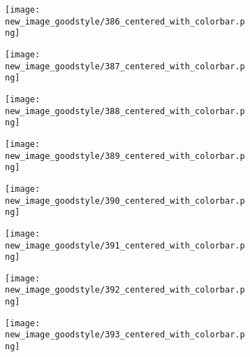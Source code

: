 \documentclass[a4paper,12pt]{article}
\begin{document}
\begin{figure}[H]
  \begin{subfigure}{0.11\textwidth}
    \texttt{[image: new\_image\_goodstyle/386\_centered\_with\_colorbar.png]}
  \end{subfigure}
  \hfill
  \begin{subfigure}{0.11\textwidth}
    \texttt{[image: new\_image\_goodstyle/387\_centered\_with\_colorbar.png]}
  \end{subfigure}
  \hfill
  \begin{subfigure}{0.11\textwidth}
    \texttt{[image: new\_image\_goodstyle/388\_centered\_with\_colorbar.png]}
  \end{subfigure}
  \hfill
  \begin{subfigure}{0.11\textwidth}
    \texttt{[image: new\_image\_goodstyle/389\_centered\_with\_colorbar.png]}
  \end{subfigure}
  \hfill
  \begin{subfigure}{0.11\textwidth}
    \texttt{[image: new\_image\_goodstyle/390\_centered\_with\_colorbar.png]}
  \end{subfigure}
  \hfill
  \begin{subfigure}{0.11\textwidth}
    \texttt{[image: new\_image\_goodstyle/391\_centered\_with\_colorbar.png]}
  \end{subfigure}
  \hfill
  \begin{subfigure}{0.11\textwidth}
    \texttt{[image: new\_image\_goodstyle/392\_centered\_with\_colorbar.png]}
  \end{subfigure}
  \hfill
  \begin{subfigure}{0.11\textwidth}
    \texttt{[image: new\_image\_goodstyle/393\_centered\_with\_colorbar.png]}
  \end{subfigure}
  \hfill
\end{figure}
\end{document}
